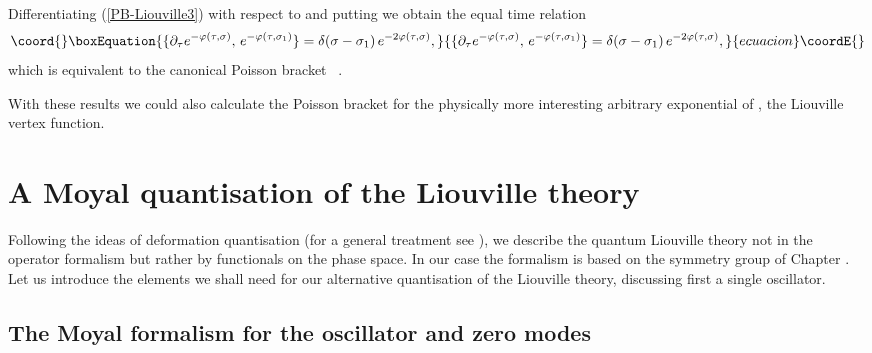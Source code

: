 \documentclass[a4paper,12pt]{article}
\begin{document}
\noindent
Differentiating (\ref{PB-Liouville3}) with respect to
\myHighlight{$\tau $}\coordHE{} and putting \coordHE{} we obtain the equal time relation
\begin{equation}\coord{}\boxEquation{\label{canonical-PB}
\{ \partial_\tau e^{-\varphi(\tau, \sigma)},\,e^{-\varphi (\tau, \sigma_1)}\}=
\delta(\sigma-\sigma_1)\, e^{-2\varphi(\tau, \sigma)},
}{\{ \partial_\tau e^{-\varphi(\tau, \sigma)},\,e^{-\varphi (\tau, \sigma_1)}\}=
\delta(\sigma-\sigma_1)\, e^{-2\varphi(\tau, \sigma)},
}{ecuacion}\coordE{}\end{equation}
which is equivalent to the canonical Poisson bracket \,
\coordHE{}.

\noindent
With these results we could also calculate the Poisson bracket for
the physically more interesting arbitrary exponential of \coordHE{}, the Liouville vertex function.



\setcounter{equation}{0}
\section{A Moyal quantisation of the Liouville theory}

Following the ideas of deformation quantisation (for a general
treatment see \cite{Flato, Reuter}), we describe the quantum Liouville
theory not in the operator formalism but rather by functionals on the
phase space. In our case the formalism is based on the symmetry group
\coordHE{} of Chapter \coordHE{}. Let us introduce the
elements we shall need  for our alternative quantisation of
the Liouville theory, discussing first a single oscillator.


\subsection{ The Moyal formalism for the oscillator and zero modes}
\end{document}
